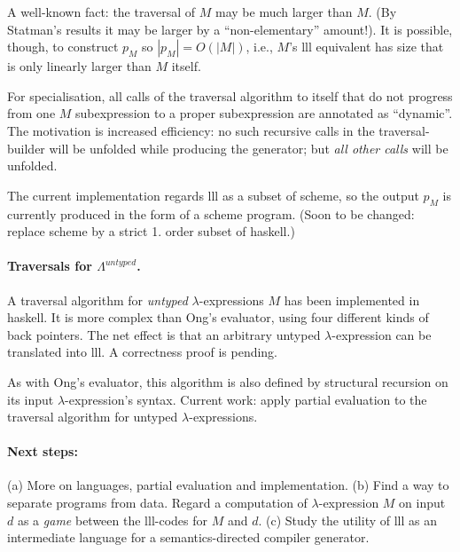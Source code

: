 \documentclass{article}
\begin{document}
A well-known fact:  the traversal of $M$ may be much larger than $M$. (By Statman's results it may be larger by a ``non-elementary'' amount!). It is possible, though, to construct $p_M$ so $|p_M| = O(|M|)$, i.e., $M$'s {\sc lll} equivalent has size that is only linearly larger than $M$
 itself.

For specialisation, all calls of the traversal algorithm to itself that do not progress from one $M$ subexpression  to a proper subexpression are annotated as ``dynamic''. 
The motivation is  increased efficiency: no such recursive calls in the traversal-builder  will  be unfolded while producing the generator;
but {\em all other calls} will be unfolded. 

The current implementation regards {\sc lll} as a subset of {\sc scheme},
so the output $p_M$ is currently produced in the form of a {\sc scheme}  program. 
(Soon to be changed: replace {\sc scheme} by a strict 1. order subset of {\sc haskell}.)



\paragraph{Traversals for $\Lambda^{untyped}$.}


A traversal algorithm for {\em untyped} $\lambda$-expressions $M$ has been implemented in {\sc haskell}. It is more complex than Ong's evaluator, using  four different kinds of back pointers. The net effect is that an arbitrary untyped $\lambda$-expression can be translated into {\sc lll}.
A correctness proof is pending.

 As with Ong's evaluator, this  algorithm is also defined by structural recursion on its input $\lambda$-expression's syntax.
 Current work: apply partial evaluation to the  traversal algorithm for untyped $\lambda$-expressions.


\paragraph{Next steps:} (a) More on languages, partial evaluation and implementation. (b) Find a way to separate programs from data. Regard a computation of $\lambda$-expression $M$ on input $d$ as a {\em game} between the {\sc lll}-codes for $M$ and $d$. (c) Study the utility of {\sc lll} as an intermediate language for a semantics-directed compiler generator.

\newpage









\nocite{*}
\end{document}
